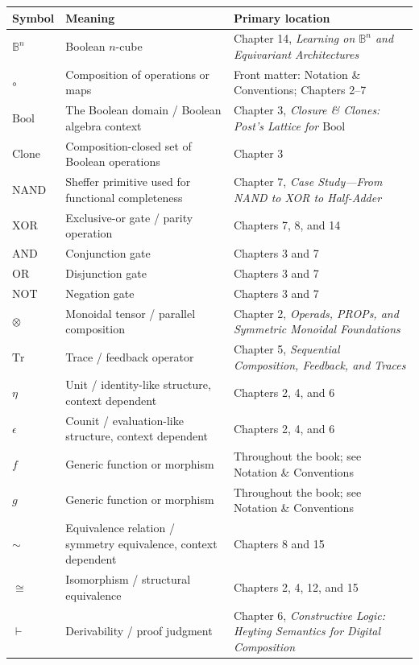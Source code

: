\documentclass[11pt]{article}
\begin{document}
\begin{center}
\begin{tabular}{@{}lll@{}}
\hline
Symbol & Meaning & Primary location \\
\hline
\(\mathbb{B}^n\) & Boolean \(n\)-cube & Chapter 14, \emph{Learning on \(\mathbb{B}^n\) and Equivariant Architectures} \\
\(\circ\) & Composition of operations or maps & Front matter: Notation \& Conventions; Chapters 2--7 \\
\(\mathrm{Bool}\) & The Boolean domain / Boolean algebra context & Chapter 3, \emph{Closure \& Clones: Post's Lattice for \(\mathrm{Bool}\)} \\
\(\mathrm{Clone}\) & Composition-closed set of Boolean operations & Chapter 3 \\
\(\mathrm{NAND}\) & Sheffer primitive used for functional completeness & Chapter 7, \emph{Case Study---From NAND to XOR to Half-Adder} \\
\(\mathrm{XOR}\) & Exclusive-or gate / parity operation & Chapters 7, 8, and 14 \\
\(\mathrm{AND}\) & Conjunction gate & Chapters 3 and 7 \\
\(\mathrm{OR}\) & Disjunction gate & Chapters 3 and 7 \\
\(\mathrm{NOT}\) & Negation gate & Chapters 3 and 7 \\
\(\otimes\) & Monoidal tensor / parallel composition & Chapter 2, \emph{Operads, PROPs, and Symmetric Monoidal Foundations} \\
\(\mathrm{Tr}\) & Trace / feedback operator & Chapter 5, \emph{Sequential Composition, Feedback, and Traces} \\
\(\eta\) & Unit / identity-like structure, context dependent & Chapters 2, 4, and 6 \\
\(\epsilon\) & Counit / evaluation-like structure, context dependent & Chapters 2, 4, and 6 \\
\(f\) & Generic function or morphism & Throughout the book; see Notation \& Conventions \\
\(g\) & Generic function or morphism & Throughout the book; see Notation \& Conventions \\
\(\sim\) & Equivalence relation / symmetry equivalence, context dependent & Chapters 8 and 15 \\
\(\cong\) & Isomorphism / structural equivalence & Chapters 2, 4, 12, and 15 \\
\(\vdash\) & Derivability / proof judgment & Chapter 6, \emph{Constructive Logic: Heyting Semantics for Digital Composition} \\
\hline
\end{tabular}
\end{center}
\end{document}
